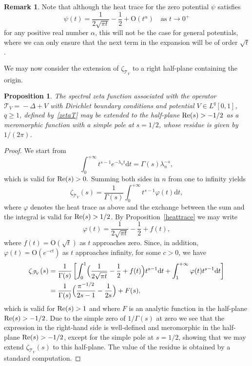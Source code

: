 \documentclass[10pt,a4paper]{amsart}
\theoremstyle{plain}
\newtheorem{prop}[theorem]{Proposition}
\theoremstyle{definition}
\newtheorem{remark}[theorem]{Remark}
\newcommand{\bo}{\mathrm{O}}
\newcommand{\ttt}{\mathscr{T}}
\renewcommand{\d}{\mathrm{d}}
\let\balpha q
\let\fr\frac
\begin{document}
\begin{remark}
Note that although the heat trace for the zero potential $\psi$ satisfies
\[
\psi(t)=\frac{1}{2\sqrt{\pi t}} - \frac{1}{2} + \bo(t^{\alpha}) \quad\text{as } t\to 0^{+}
\]
for any positive real number $\alpha$, this will not be the case for general potentials, where we can only ensure that the next term in the expansion
will be of order $\sqrt{t}$.
\end{remark}

We may now consider the extension of $\zeta_{\ttt_V}$ to a right half-plane containing the origin.

\begin{prop}\label{meromorphicext}
The spectral zeta function associated with the operator \hbox{$\!\ttt_V\!=\!-\Delta\!+\!V$} with Dirichlet boundary conditions and potential $V\in L^{\balpha}[0,1]$, $\balpha\geq 1$,
defined by~\eqref{zetaT} may be extended to the half-plane $\re(s)>-1/2$ as a meromorphic function with a simple pole at $s=1/2$, whose residue is
given by $1/(2\pi)$.
\end{prop}
\begin{proof}
We start from
\[
\int_{0}^{+\infty} t^{s-1} e^{-\lambda_{n}t} \d t = \Gamma(s) \lambda_{n}^{-s},
\]
which is valid for $\re(s)>0.$ Summing both sides in $n$ from one to infinity yields
\[
\zeta_{\ttt_V}(s) = \fr{1}{\Gamma(s)} \int_{0}^{+\infty} t^{s-1} \varphi(t) \d t,
\]
where $\varphi$ denotes the heat trace as above and the exchange between the sum and the integral is valid for $\re(s)>1/2$.
By Proposition~\ref{heattrace} we may write
\[
\varphi(t) = \frac{1}{2\sqrt{\pi t}} - \frac{1}{2} + f(t),
\]
where $f(t) = \bo(\sqrt{t})$ as $t$ approaches zero. Since, in addition, $\varphi(t) = \bo(e^{-ct})$ as $t$ approaches infinity, for some $c>0$, we have
\begin{align*}
\zeta_{\ttt_V}(s) & = \fr{1}{\Gamma(s)}\left[ \int_{0}^{1} \Bigl(\frac{1}{2\sqrt{\pi t}} - \frac{1}{2} + f(t) \Bigr) t^{s-1} \d t +
\int_{1}^{+\infty} \varphi(t) t^{s-1} \d t\right]\\
& = \fr{1}{\Gamma(s)}\Bigl(\fr{\pi^{-1/2}}{2s-1} -\fr{1}{2s} \Bigr) + F(s),
\end{align*}
which is valid for $\re(s)>1$ and where $F$ is an analytic function in the half-plane $\re(s)>-1/2$. Due to the simple zero of $1/\Gamma(s)$
at zero we see that the expression in the right-hand side is well-defined and meromorphic in the half-plane $\re(s)>-1/2$, except for the
simple pole at $s=1/2$, showing that we may extend $\zeta_{\ttt_V}(s)$ to this half-plane. The value of the residue is obtained by a
standard computation.
\end{proof}
\end{document}

